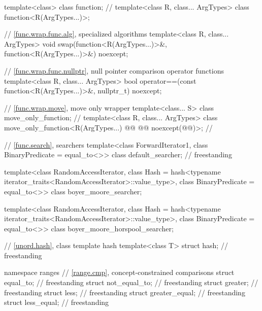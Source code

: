 \begin{codeblock}
{  template<class> class function;       // \notdef
  template<class R, class... ArgTypes> class function<R(ArgTypes...)>;

  // \ref{func.wrap.func.alg}, specialized algorithms
  template<class R, class... ArgTypes>
    void swap(function<R(ArgTypes...)>&, function<R(ArgTypes...)>&) noexcept;

  // \ref{func.wrap.func.nullptr}, null pointer comparison operator functions
  template<class R, class... ArgTypes>
    bool operator==(const function<R(ArgTypes...)>&, nullptr_t) noexcept;

  // \ref{func.wrap.move}, move only wrapper
  template<class... S> class move_only_function;        // \notdef
  template<class R, class... ArgTypes>
    class move_only_function<R(ArgTypes...) @\cv{}@ @@ noexcept(@@)>; // \seebelow

  // \ref{func.search}, searchers
  template<class ForwardIterator1, class BinaryPredicate = equal_to<>>
    class default_searcher;                                                         // freestanding

  template<class RandomAccessIterator,
           class Hash = hash<typename iterator_traits<RandomAccessIterator>::value_type>,
           class BinaryPredicate = equal_to<>>
    class boyer_moore_searcher;

  template<class RandomAccessIterator,
           class Hash = hash<typename iterator_traits<RandomAccessIterator>::value_type>,
           class BinaryPredicate = equal_to<>>
    class boyer_moore_horspool_searcher;

  // \ref{unord.hash}, class template hash
  template<class T>
    struct hash;                                                                    // freestanding

  namespace ranges {
    // \ref{range.cmp}, concept-constrained comparisons
    struct equal_to;                                                                // freestanding
    struct not_equal_to;                                                            // freestanding
    struct greater;                                                                 // freestanding
    struct less;                                                                    // freestanding
    struct greater_equal;                                                           // freestanding
    struct less_equal;                                                              // freestanding
  }
}
\end{codeblock}


